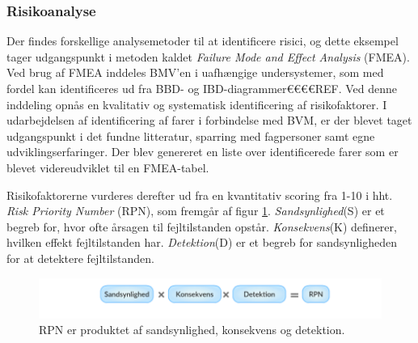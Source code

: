 	\subsubsection{Risikoanalyse}
	Der findes forskellige analysemetoder til at identificere risici, og dette eksempel tager udgangspunkt i metoden kaldet \textit{Failure Mode and Effect Analysis}{} (FMEA). Ved brug af FMEA inddeles BMV'en i uafhængige undersystemer, som med fordel kan identificeres ud fra BBD- og IBD-diagrammer€€€€REF. Ved denne inddeling opnås en kvalitativ og systematisk identificering af risikofaktorer.
	I udarbejdelsen af identificering af farer i forbindelse med BVM, er der blevet taget udgangspunkt i det fundne litteratur, sparring med fagpersoner samt egne udviklingserfaringer. Der blev genereret en liste over identificerede farer som er blevet videreudviklet til en FMEA-tabel.  
	
	Risikofaktorerne vurderes derefter ud fra en kvantitativ scoring fra 1-10 i hht. \textit{Risk Priority Number}{} (RPN), som fremgår af figur \ref{fig:rpn}. \textit{Sandsynlighed}{}(S) er et begreb for, hvor ofte årsagen til fejltilstanden opstår. \textit{Konsekvens}{}(K) definerer, hvilken effekt fejltilstanden har. \textit{Detektion}{}(D) er et begreb for sandsynligheden for at detektere fejltilstanden. 	
	 
	\begin{figure}[htb]
	\centering
	\includegraphics[width=5in]{RPN}
	\caption	{RPN er produktet af sandsynlighed, konsekvens og detektion.}
	\label{fig:rpn}
	\end{figure}

